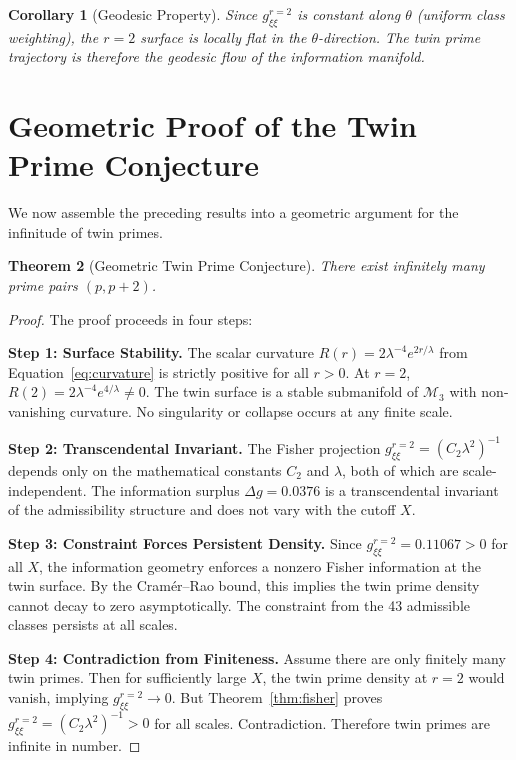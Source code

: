 \documentclass[12pt]{article}
\newtheorem{theorem}{Theorem}[section]
\newtheorem{corollary}[theorem]{Corollary}
\begin{document}
\begin{corollary}[Geodesic Property]
Since $g_{\xi\xi}^{r=2}$ is constant along $\theta$ (uniform class weighting),
the $r=2$ surface is locally flat in the $\theta$-direction. The twin prime
trajectory is therefore the geodesic flow of the information manifold.
\end{corollary}

\section{Geometric Proof of the Twin Prime Conjecture}

We now assemble the preceding results into a geometric argument for the
infinitude of twin primes.

\begin{theorem}[Geometric Twin Prime Conjecture]
There exist infinitely many prime pairs $(p, p+2)$.
\end{theorem}

\begin{proof}
The proof proceeds in four steps:

\textbf{Step 1: Surface Stability.}
The scalar curvature $R(r) = 2\lambda^{-4} e^{2r/\lambda}$ from
Equation~\eqref{eq:curvature} is strictly positive for all $r > 0$.
At $r=2$, $R(2) = 2\lambda^{-4} e^{4/\lambda} \neq 0$. The twin surface is
a stable submanifold of $\mathcal{M}_3$ with non-vanishing curvature. No
singularity or collapse occurs at any finite scale.

\textbf{Step 2: Transcendental Invariant.}
The Fisher projection $g_{\xi\xi}^{r=2} = (C_2\lambda^2)^{-1}$ depends only on
the mathematical constants $C_2$ and $\lambda$, both of which are scale-independent.
The information surplus $\Delta g = 0.0376$ is a transcendental invariant of the
admissibility structure and does not vary with the cutoff $X$.

\textbf{Step 3: Constraint Forces Persistent Density.}
Since $g_{\xi\xi}^{r=2} = 0.11067 > 0$ for all $X$, the information geometry
enforces a nonzero Fisher information at the twin surface. By the Cram\'er--Rao
bound, this implies the twin prime density cannot decay to zero asymptotically.
The constraint from the 43 admissible classes persists at all scales.

\textbf{Step 4: Contradiction from Finiteness.}
Assume there are only finitely many twin primes. Then for sufficiently large $X$,
the twin prime density at $r=2$ would vanish, implying $g_{\xi\xi}^{r=2} \to 0$.
But Theorem~\ref{thm:fisher} proves $g_{\xi\xi}^{r=2} = (C_2\lambda^2)^{-1} > 0$
for all scales. Contradiction. Therefore twin primes are infinite in number.
\end{proof}
\end{document}
